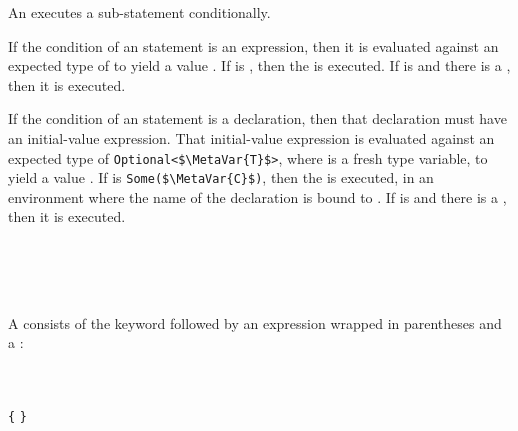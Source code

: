 An  executes a sub-statement conditionally.

If the condition of an  statement is an expression, then it is evaluated against an expected type of  to yield a value .
If  is , then the  is executed.
If  is  and there is a , then it is executed.

If the condition of an  statement is a  declaration, then that declaration must have an initial-value expression.
That initial-value expression is evaluated against an expected type of \lstinline[style=SlangCodeStyle]|Optional<$\MetaVar{T}$>|, where  is a fresh type variable, to yield a value .
If  is \lstinline[style=SlangCodeStyle]|Some($\MetaVar{C}$)|, then the  is executed, in an environment where the name of the  declaration is bound to .
If  is  and there is a , then it is executed.

\begin{Checking}

 \\
 \\
 \\

\end{Checking}


A  consists of the  keyword followed by an expression wrapped in parentheses and a :

\begin{Syntax}
	 \\
		 \code{(}  \code{)} \\
		\lstinline|{|  \lstinline|}|

	 \\
		\SynPlus {}\SynPlus

	 \\
	
	 \\
		  \code{:}
	
	 \\
		 \code{;}
\end{Syntax}

